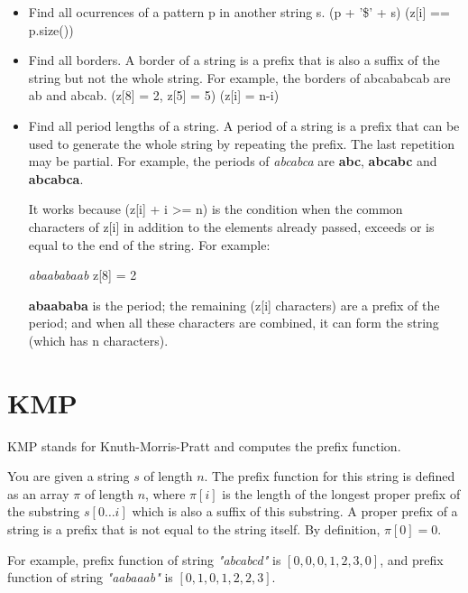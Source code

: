     \begin{itemize}
		\item Find all ocurrences of a pattern p in another string s. 
        (p + '\$' + s) (z[i] == p.size())

        \item Find all borders. A border of a string is a prefix that is also a suffix of 
        the string but not the whole string. 
        For example, the borders of abcababcab are ab and abcab. (z[8] = 2, z[5] = 5)
        (z[i] = n-i)

        \item Find all period lengths of a string. 
        A period of a string is a prefix that can be used to generate the whole string by repeating
        the prefix. The last repetition may be partial. For example, the periods of \textit{abcabca} 
        are \textbf{abc}, \textbf{abcabc} and \textbf{abcabca}.

        It works because (z[i] + i >= n) is the condition when the common characters of z[i] in addition
        to the elements already passed, exceeds or is equal to the end of the string. For example:

        \textit{abaababaab}
        z[8] = 2

        \textbf{abaababa} is the period; the remaining (z[i] characters) are a prefix of the period; 
        and when all these characters are combined, it can form the string (which has n characters).

	\end{itemize}


\section{KMP}

    KMP stands for Knuth-Morris-Pratt and computes the prefix function.

    You are given a string $s$ of length $n$. 
    The prefix function for this string is defined as an array $\pi$ of length $n$, 
    where $\pi[i]$ is the length of the longest proper prefix of the substring $s[0 \dots i]$
    which is also a suffix of this substring. A proper prefix of a string is a prefix that
    is not equal to the string itself. By definition, $\pi[0] = 0$.

    For example, prefix function of string \textit{"abcabcd"} is $[0, 0, 0, 1, 2, 3, 0]$,
    and prefix function of string \textit{"aabaaab"} is $[0, 1, 0, 1, 2, 2, 3]$.

